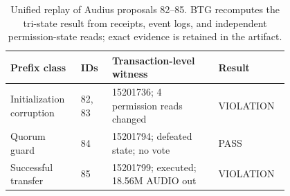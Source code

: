 \begin{table}[t]\centering\scriptsize
\caption{Unified replay of Audius proposals 82--85. BTG recomputes the tri-state result from receipts, event logs, and independent permission-state reads; exact evidence is retained in the artifact.}
\label{tab:audius-incident}
\begin{tabular}{@{}p{0.20\linewidth}p{0.10\linewidth}p{0.34\linewidth}p{0.16\linewidth}@{}}\toprule
Prefix class & IDs & Transaction-level witness & Result \\ \midrule
Initialization corruption & 82, 83 & 15201736; 4 permission reads changed & VIOLATION \\
Quorum guard & 84 & 15201794; defeated state; no vote & PASS \\
Successful transfer & 85 & 15201799; executed; 18.56M AUDIO out & VIOLATION \\
\bottomrule
\end{tabular}
\end{table}
